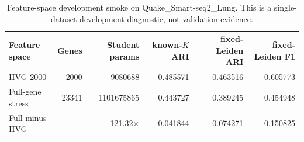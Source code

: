 \begin{table}[ht]
\centering
\caption{Feature-space development smoke on Quake\_Smart-seq2\_Lung. This is a single-dataset development diagnostic, not validation evidence.}
\label{tab:feature-space-smoke}
\scriptsize
\begin{tabular}{lrrrrr}
\toprule
Feature space & Genes & Student params & known-\(K\) ARI & fixed-Leiden ARI & fixed-Leiden F1 \\
\midrule
HVG 2000 & 2000 & 9080688 & 0.485571 & 0.463516 & 0.605773 \\
Full-gene stress & 23341 & 1101675865 & 0.443727 & 0.389245 & 0.454948 \\
\midrule
Full minus HVG & -- & 121.32$\times$ & -0.041844 & -0.074271 & -0.150825 \\
\bottomrule
\end{tabular}
\end{table}
